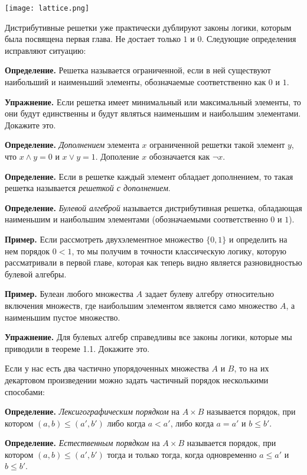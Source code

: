 \texttt{[image: lattice.png]}

Дистрибутивные решетки уже практически дублируют законы логики, которым была посвящена первая глава. Не достает только $1$ и $0$. Следующие определения исправляют ситуацию:

{\bfseries Определение.} Решетка называется ограниченной, если в ней существуют наибольший и наименьший элементы, обозначаемые соответственно как $0$ и $1$.

{\bfseries Упражнение.} Если решетка имеет минимальный или максимальный элементы, то они будут единственны и будут являться наименьшим и наибольшим элементами. Докажите это.

{\bfseries Определение.} {\slshape Дополнением} элемента $x$ ограниченной решетки такой элемент $y$, что $x\wedge y = 0$ и $x \vee y = 1$. Дополение $x$ обозначается как $\neg x$.

{\bfseries Определение.} Если в решетке каждый элемент обладает дополнением, то такая решетка называется {\slshape решеткой с дополнением}.

{\bfseries Определение.} {\slshape Булевой алгеброй} называется дистрибутивная решетка, обладающая наименьшим и наибольшим элементами (обозначаемыми соответственно $0$ и $1$).

{\bfseries Пример.} Если рассмотреть двухэлементное множество $\{0, 1\}$ и определить на нем порядок $0 < 1$, то мы получим в точности классическую логику, которую рассматривали в первой главе, которая как теперь видно является разновидностью булевой алгебры.

{\bfseries Пример.} Булеан любого множества $A$ задает булеву алгебру относительно включения множеств, где наибольшим элементом является само множество $A$, а наименьшим пустое множество.

{\bfseries Упражнение.} Для булевых алгебр справедливы все законы логики, которые мы приводили в теореме 1.1. Докажите это.

Если у нас есть два частично упорядоченных множества $A$ и $B$, то на их декартовом произведении можно задать частичный порядок несколькими способами:

{\bfseries Определение.} {\slshape Лексигографическим порядком} на $A\times B$ называется порядок, при котором $(a, b) \le (a', b')$ либо когда $a < a'$, либо когда $a=a'$ и $b\le b'$.

{\bfseries Определение.} {\slshape Естественным порядком} на $A\times B$ называется порядок, при котором $(a, b) \le (a', b')$ тогда и только тогда, когда одновременно $a \le a'$ и $b \le b'$.


